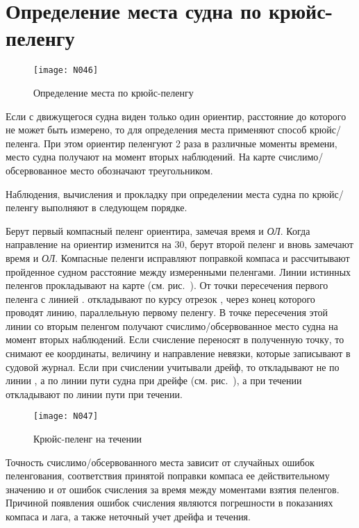 \section{Определение места судна по крюйс-пеленгу}


\begin{figure}[htb]
  \centering{}
  \texttt{[image: N046]}
  \caption{Определение места по крюйс-пеленгу}
  \label{fig:N46}
\end{figure}

Если с движущегося судна виден только один ориентир, расстояние до которого не может быть измерено, то для определения места применяют способ крюйс\-/пеленга. При этом ориентир пеленгуют 2 раза в различные моменты времени, место судна получают на момент вторых наблюдений. На карте счислимо\-/обсервованное место обозначают треугольником. 

Наблюдения, вычисления и прокладку при определении места судна по крюйс\-/пеленгу выполняют в следующем порядке. 

Берут первый компасный пеленг ориентира, замечая время и \textit{ОЛ}. Когда направление на ориентир изменится на 30\gr, берут второй пеленг и вновь замечают время и \textit{ОЛ}. Компасные пеленги исправляют поправкой компаса и рассчитывают пройденное судном расстояние между измеренными пеленгами. Линии истинных пеленгов прокладывают на карте (см. рис.~). От точки пересечения первого пеленга с линией \IK. откладывают по курсу отрезок , через конец которого проводят линию, параллельную первому пеленгу. В точке пересечения этой линии со вторым пеленгом получают счислимо\-/обсервованное место судна на момент вторых наблюдений. Если счисление переносят в полученную точку, то снимают ее координаты, величину и направление невязки, которые записывают в судовой журнал. Если при счислении учитывали дрейф, то  откладывают не по линии \IK, а по линии пути судна при дрейфе (см. рис.~), а при течении откладывают  по линии пути при течении. 

\begin{figure}[htb]
  \centering{}
  \texttt{[image: N047]}
  \caption{Крюйс-пеленг на течении}
  \label{fig:N47}
\end{figure}

Точность счислимо\-/обсервованного места зависит от случайных ошибок пеленгования, соответствия принятой поправки компаса ее действительному значению и от ошибок счисления за время между моментами взятия пеленгов. Причиной появления ошибок счисления являются погрешности в показаниях компаса и лага, а также неточный учет дрейфа и течения. 

